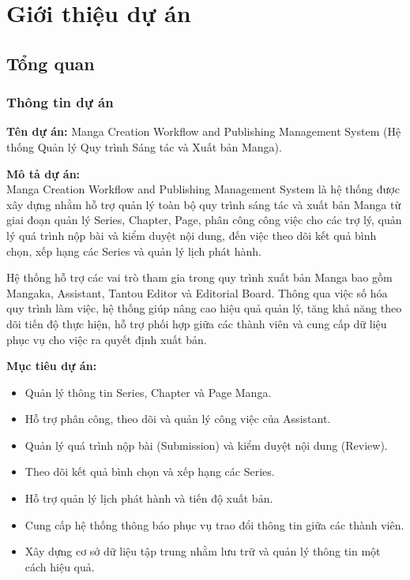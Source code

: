 \chapter{Giới thiệu dự án}
\label{chap:gioi_thieu_du_an}

\section{Tổng quan}
\label{sec:tong_quan}

\subsection{Thông tin dự án}
\label{subsec:thong_tin_du_an}

\textbf{Tên dự án:} Manga Creation Workflow and Publishing Management System (Hệ thống Quản lý Quy trình Sáng tác và Xuất bản Manga).

\textbf{Mô tả dự án:} \\
Manga Creation Workflow and Publishing Management System là hệ thống được xây dựng nhằm hỗ trợ quản lý toàn bộ quy trình sáng tác và xuất bản Manga từ giai đoạn quản lý Series, Chapter, Page, phân công công việc cho các trợ lý, quản lý quá trình nộp bài và kiểm duyệt nội dung, đến việc theo dõi kết quả bình chọn, xếp hạng các Series và quản lý lịch phát hành.

Hệ thống hỗ trợ các vai trò tham gia trong quy trình xuất bản Manga bao gồm Mangaka, Assistant, Tantou Editor và Editorial Board. Thông qua việc số hóa quy trình làm việc, hệ thống giúp nâng cao hiệu quả quản lý, tăng khả năng theo dõi tiến độ thực hiện, hỗ trợ phối hợp giữa các thành viên và cung cấp dữ liệu phục vụ cho việc ra quyết định xuất bản.

\textbf{Mục tiêu dự án:}
\begin{itemize}
    \item Quản lý thông tin Series, Chapter và Page Manga.
    \item Hỗ trợ phân công, theo dõi và quản lý công việc của Assistant.
    \item Quản lý quá trình nộp bài (Submission) và kiểm duyệt nội dung (Review).
    \item Theo dõi kết quả bình chọn và xếp hạng các Series.
    \item Hỗ trợ quản lý lịch phát hành và tiến độ xuất bản.
    \item Cung cấp hệ thống thông báo phục vụ trao đổi thông tin giữa các thành viên.
    \item Xây dựng cơ sở dữ liệu tập trung nhằm lưu trữ và quản lý thông tin một cách hiệu quả.
\end{itemize}

